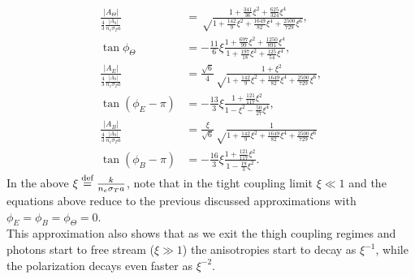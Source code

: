 \begin{subequations}\label{eq:improved_TightCouplingApproximation}
    \begin{align}
        \frac{|A_\Theta|}{\frac{4}{3}\frac{|A_h|}{n_e\sigma_T a}}&=\sqrt\frac{1+\frac{341}{36}\xi^2+\frac{625}{324}\xi^4}{1+\frac{142}{9}\xi^2+\frac{1649}{82}\xi^4+\frac{2500}{729}\xi^6},\nonumber\\\tan\phi_\Theta&=-\frac{11}{6}\xi\frac{1+\frac{697}{99}\xi^2+\frac{1250}{891}\xi^4}{1+\frac{197}{18}\xi^2+\frac{125}{54}\xi^4},\\
        \frac{|A_E|}{\frac{4}{3}\frac{|A_h|}{n_e\sigma_T a}}&=\frac{\sqrt 6}{4}\sqrt\frac{1+\xi^2}{1+\frac{142}{9}\xi^2+\frac{1649}{82}\xi^4+\frac{2500}{729}\xi^6},\nonumber\\\tan(\phi_E-\pi)&=-\frac{13}{3}\xi\frac{1+\frac{121}{117}\xi^2}{1-\xi^2-\frac{50}{27}\xi^4},\\
        \frac{|A_B|}{\frac{4}{3}\frac{|A_h|}{n_e\sigma_T a}}&=\frac{\xi}{\sqrt 6}\sqrt\frac{1}{1+\frac{142}{9}\xi^2+\frac{1649}{82}\xi^4+\frac{2500}{729}\xi^6}\nonumber\\\tan(\phi_B-\pi)&=-\frac{16}{3}\xi\frac{1+\frac{121}{117}\xi^2}{1-\frac{19}{3}\xi^2}.
    \end{align}
\end{subequations}
In the above $\xi\stackrel{\text{def}}{=}\frac{k}{n_e\sigma_T a}$, note that in the tight coupling limit $\xi\ll1$ and the equations above reduce to the previous discussed approximations with $\phi_E=\phi_B=\phi_\Theta=0$.\\ This approximation also shows that as we exit the thigh coupling regimes and photons start to free stream ($\xi\gg1$) the anisotropies start to decay  as $\xi^{-1}$, while the polarization decays even faster as $\xi^{-2}$.\\